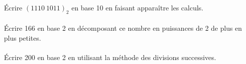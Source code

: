 \documentclass[a4paper,12pt,eval,firamath]{nsi}
\begin{document}
\maketitle

\'Ecrire $(1110\ 1011)_2$ en base 10 en faisant apparaître les calculs.\\

\\

\'Ecrire 166 en base 2 en décomposant ce nombre en puissances de 2 de plus en plus petites.\\

\\

\'Ecrire 200 en base 2 en utilisant la méthode des divisions successives.\\

\end{document}
